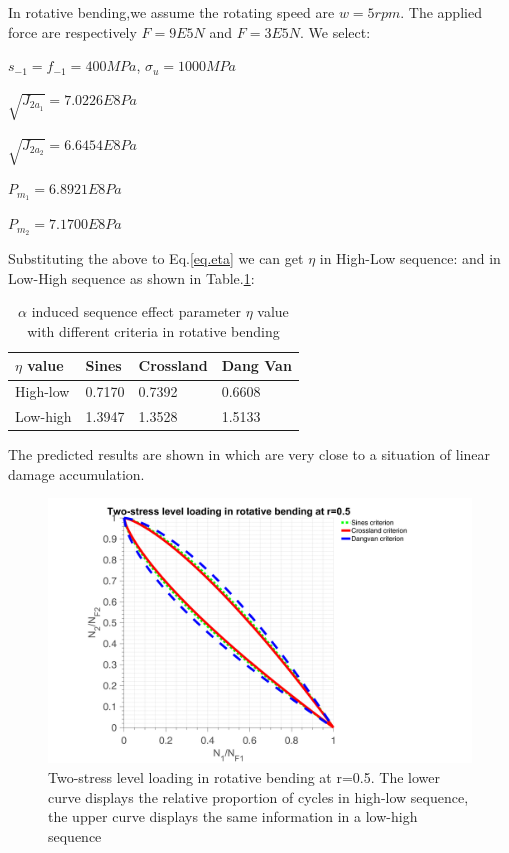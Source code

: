 In rotative bending,we assume the rotating speed are $w=5rpm$. The applied force are respectively $F=9E5 N$ and $F=3E5 N$. We select:

$s_{-1}=f_{-1}=400MPa$, $\sigma_{u}=1000MPa$

\vspace{6pt}
$\sqrt{J_{2a_1}}=7.0226E8 Pa$

\vspace{6pt}
$\sqrt{J_{2a_2}}=6.6454E8 Pa$

\vspace{6pt}
$P_{m_1}=6.8921E8 Pa$

\vspace{6pt}
$P_{m_2}=7.1700E8 Pa$

Substituting the above to Eq.\eqref{eq.eta} we can get $\eta$ in High-Low sequence:
and in Low-High sequence as shown in Table.\ref{tab.etarb}:
\begin{table}[!h]
	\centering
	\begin{tabular}{llll}
		\hline
		$\eta$ value   & Sines  & Crossland & Dang Van \\ \hline
		High-low & 0.7170 &  0.7392 &   0.6608   \\
		Low-high & 1.3947 & 1.3528   &  1.5133  \\ \hline
	\end{tabular}
	\caption{$\alpha$ induced sequence effect parameter $\eta$ value with different criteria in rotative bending}
	\label{tab.etarb}
\end{table}

The predicted results are shown in  which are very close to a situation of linear damage accumulation.

\begin{figure}[!h]
	\centering
	\includegraphics[width=\textwidth]{figures//2stressRB.png} 
	\caption{Two-stress level loading in rotative bending at r=0.5. The lower curve displays the relative proportion of cycles in high-low sequence, the upper curve displays the same information in a low-high sequence}
	\label{2stressRB}
\end{figure}
\clearpage

